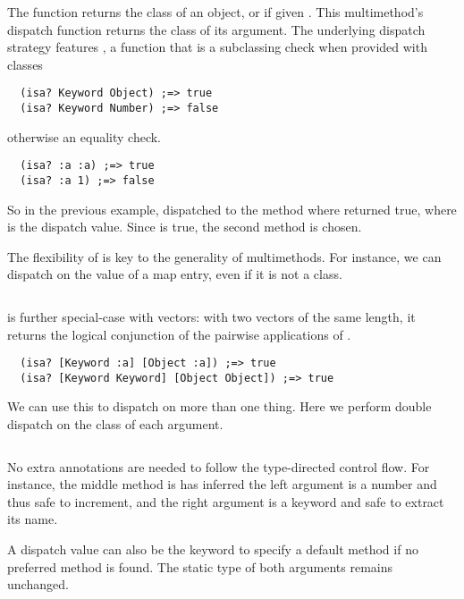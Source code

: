 The  function returns the class of an object, or 
if given . This multimethod's dispatch function returns the class of its
argument. The underlying dispatch strategy features , a function
that is a subclassing check when provided with classes

\begin{verbatim}
  (isa? Keyword Object) ;=> true
  (isa? Keyword Number) ;=> false
\end{verbatim}

otherwise an equality check.

\begin{verbatim}
  (isa? :a :a) ;=> true
  (isa? :a 1) ;=> false
\end{verbatim}

So in the previous example,  dispatched to the method
where  returned true, where  is the dispatch value.
Since  is true, the second method is chosen.

The flexibility of  is key to the generality of multimethods. 
For instance, we can dispatch on the value of
a map entry, even if it is not a class.

\inputminted[firstline=4,lastline=23]{clojure}{code/demo/src/demo/eg5.clj}

 is further special-case with vectors: with two vectors of the
same length, it returns the logical conjunction of the pairwise applications
of .

\begin{verbatim}
  (isa? [Keyword :a] [Object :a]) ;=> true
  (isa? [Keyword Keyword] [Object Object]) ;=> true
\end{verbatim}

We can use this to dispatch on more than one thing. Here we perform
double dispatch on the class of each argument.

\inputminted[firstline=6,lastline=23]{clojure}{code/demo/src/demo/eg7.clj}

No extra annotations are needed to follow the type-directed control flow.
For instance, the middle method is has inferred the left argument is a number
and thus safe to increment, and the right argument is a keyword and safe to
extract its name.

A dispatch value can also be the keyword  to specify a default
method if no preferred method is found. The static type of both arguments
remains unchanged.


